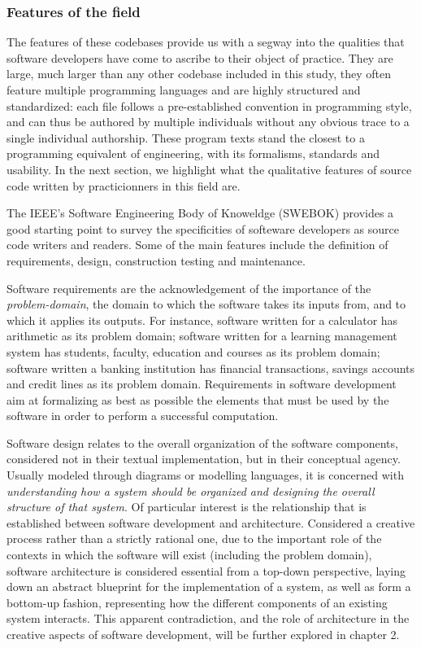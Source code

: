 \subsubsection{Features of the field}

The features of these codebases provide us with a segway into the qualities that software developers have come to ascribe to their object of practice. They are large, much larger than any other codebase included in this study, they often feature multiple programming languages and are highly structured and standardized: each file follows a pre-established convention in programming style, and can thus be authored by multiple individuals without any obvious trace to a single individual authorship. These program texts stand the closest to a programming equivalent of engineering, with its formalisms, standards and usability. In the next section, we highlight what the qualitative features of source code written by practicionners in this field are.

The IEEE's Software Engineering Body of Knoweldge (SWEBOK) provides a good starting point to survey the specificities of softeware developers as source code writers and readers\cite{bourque_swebok_2014}. Some of the main features include the definition of requirements, design, construction testing and maintenance.

Software requirements are the acknowledgement of the importance of the \emph{problem-domain}, the domain to which the software takes its inputs from, and to which it applies its outputs. For instance, software written for a calculator has arithmetic as its problem domain; software written for a learning management system has students, faculty, education and courses as its problem domain; software written a banking institution has financial transactions, savings accounts and credit lines as its problem domain. Requirements in software development aim at formalizing as best as possible the elements that must be used by the software in order to perform a successful computation.

Software design relates to the overall organization of the software components, considered not in their textual implementation, but in their conceptual agency. Usually modeled through diagrams or modelling languages, it is concerned with \emph{understanding how a system should be
organized and designing the overall structure of that system}\cite{sommerville_software_2010}. Of particular interest is the relationship that is established between software development and architecture. Considered a creative process rather than a strictly rational one, due to the important role of the contexts in which the software will exist (including the problem domain)\cite{sommerville_software_2010}, software architecture is considered essential from a top-down perspective, laying down an abstract blueprint for the implementation of a system, as well as form a bottom-up fashion, representing how the different components of an existing system interacts. This apparent contradiction, and the role of architecture in the creative aspects of software development, will be further explored in chapter 2.

